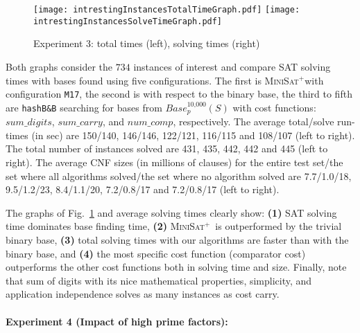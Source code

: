 \documentclass[envcountsame]{llncs}
\newcommand\minisatp{\textsc{MiniSat$^+$}}
\newcommand{\Base}{\mathit{Base}}
\newcommand{\sumCarry}{\mathit{sum\_carry}}
\newcommand{\sumDigits}{\mathit{sum\_digits}}
\newcommand{\numComparators}{\mathit{num\_comp}}
\begin{document}
\begin{figure}
  \centering
  \vspace{-5ex}
  \texttt{[image: intrestingInstancesTotalTimeGraph.pdf]}
  \texttt{[image: intrestingInstancesSolveTimeGraph.pdf]}
\vspace{-3ex}
  \caption{Experiment 3: total times (left), solving times (right) }
 \vspace{-5ex}
\label{fig:results2}
\end{figure}
\noindent Both graphs consider the $734$ instances of interest and compare
SAT solving times with bases found using five configurations.  The first is \minisatp with
configuration \texttt{M17}, the second is with respect to the binary
base, the third to fifth are \texttt{hashB\&B}
searching for bases from $\Base_p^{\text{10,000}}(S)$
with cost functions: $\sumDigits$, $\sumCarry$, and
$\numComparators$, respectively.
The average total/solve run-times (in sec) are 150/140, 146/146,
122/121, 116/115 and 108/107 (left to right). The total number of
instances solved are 431, 435, 442, 442 and 445 (left to right).  
The average CNF sizes (in millions of clauses) for the entire
test set/the set where all algorithms solved/the set where
no algorithm solved are 7.7/1.0/18,
9.5/1.2/23, 8.4/1.1/20, 7.2/0.8/17
and 7.2/0.8/17 (left to right).  

The graphs of Fig.~\ref{fig:results2} and average solving times
clearly show: \textbf{(1)} SAT solving time dominates base
finding time, \textbf{(2)} \minisatp\ is outperformed by the trivial
binary base,  \textbf{(3)}
total solving times with our algorithms are faster than with the binary
base, and \textbf{(4)} the most specific
cost function (comparator cost) outperforms the other cost functions
both in solving time and size.  Finally, note that sum of
digits with its nice mathematical properties, simplicity, and
application independence solves as many instances as cost carry.




\paragraph{Experiment 4 (Impact of high prime factors):}
\end{document}
